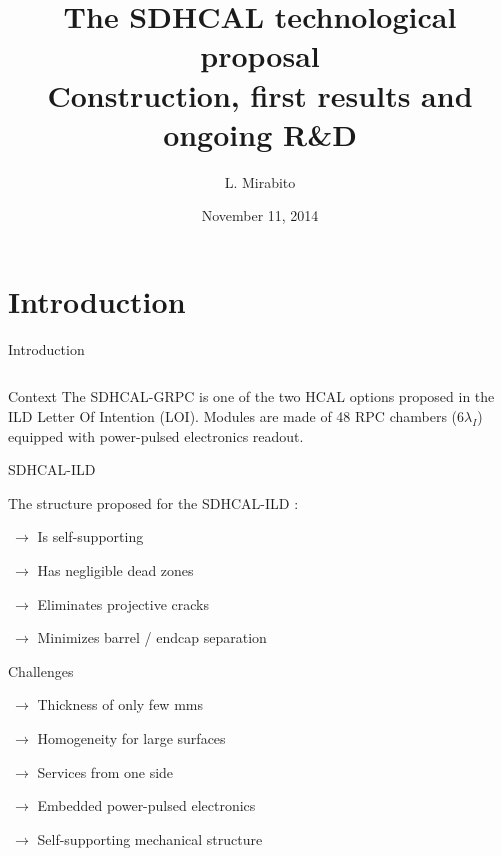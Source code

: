 \documentclass[10pt]{beamer}
\title[The SDHCAL technological proposal]{The SDHCAL technological proposal \\ Construction, first results and ongoing R\&D}
\author{L. Mirabito}
\institute{IPN Lyon, UCB Lyon, IN2P3, CNRS}
\date{November 11, 2014}
\begin{document}


\begin{frame}
  \titlepage
\end{frame}

\section{Introduction}
\begin{frame}[shrink=5]{Introduction}


  \begin{columns}
    \begin{column}{0.6\textwidth}
      \begin{block}{\small Context}
   	{\small The SDHCAL-GRPC is one of the two HCAL options proposed
          in the ILD Letter Of Intention (LOI). Modules are  made of 
          48 RPC chambers (6$\lambda_I$) equipped with 
          power-pulsed electronics readout.}   
      \end{block}
      
      \begin{block}{ \small SDHCAL-ILD}
        {\small The structure proposed for the SDHCAL-ILD :
          \par $ ~ \rightarrow$ Is self-supporting 
          \par $ ~\rightarrow$ Has negligible dead zones 
          \par $ ~ \rightarrow$ Eliminates projective cracks 
          \par $ ~ \rightarrow$ Minimizes barrel / endcap separation 
        }
      \end{block}

      \begin{block}{\small  Challenges}
        {\small 
          \par $ ~ \rightarrow$ Thickness of only few mms
          \par $ ~ \rightarrow$ Homogeneity for large surfaces
          \par $ ~ \rightarrow$ Services from one side
          \par $ ~ \rightarrow$ Embedded power-pulsed electronics
          \par $ ~ \rightarrow$ Self-supporting mechanical structure 
          
}
\end{block}
\end{column}
\end{columns}
\end{frame}
\end{document}
